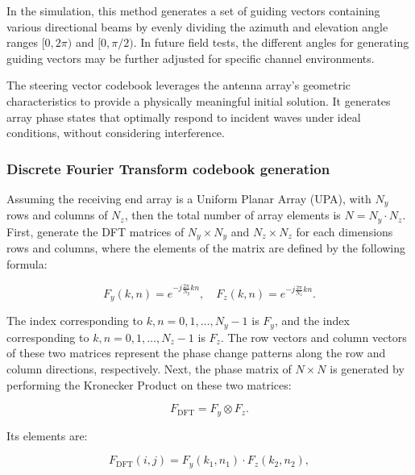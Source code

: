 \documentclass[lettersize,journal]{IEEEtran}
\begin{document}
In the simulation, this method generates a set of guiding vectors containing various directional beams by evenly dividing the azimuth and elevation angle ranges \(\lbrack 0,2\pi)\) and \(\lbrack 0,\pi/2)\). In future field tests, the different angles for generating guiding vectors may be further adjusted for specific channel environments.

The steering vector codebook leverages the antenna array's geometric characteristics to provide a physically meaningful initial solution. It generates array phase states that optimally respond to incident waves under ideal conditions, without considering interference.

\subsubsection{Discrete Fourier Transform codebook generation}\label{discrete-fourier-transform-codebook-generation}


Assuming the receiving end array is a Uniform Planar Array (UPA), with \(N_{y}\) rows and columns
of \(N_{z}\), then the total number of array elements is \(N = N_{y} \cdot N_{z}\). First, generate the DFT matrices of \(N_{y} \times N_{y}\) and \(N_{z} \times N_{z}\) for each dimension\textquotesingle s rows and columns, where the elements of the matrix are defined by the following formula:

\begin{equation}
  F_{y}(k, n) = e^{-j\frac{2\pi}{N_{y}}kn}, \quad F_{z}(k, n) = e^{-j\frac{2\pi}{N_{z}}kn}.
  \label{eq:dft_elements}
\end{equation}

The index corresponding to \(k,n = 0,1,\ldots,N_{y} - 1\) is \(F_{y}\), and the index corresponding to \(k,n = 0,1,\ldots,N_{z} - 1\) is \(F_{z}\). The row vectors and column vectors of these two matrices
represent the phase change patterns along the row and column directions, respectively. Next, the phase matrix of \(N \times N\) is generated by performing the Kronecker Product on these two matrices:

\begin{equation}
  F_{\text{DFT}} = F_{y} \otimes F_{z}.
  \label{eq:kronecker_product}
\end{equation}

Its elements are:

\begin{equation}
  F_{\text{DFT}}(i,j) = F_{y}(k_{1},n_{1}) \cdot F_{z}(k_{2},n_{2}),
  \label{eq:kronecker_elements}
\end{equation}
\end{document}

